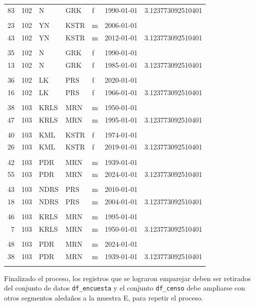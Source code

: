 \documentclass[
  12pt,
]{book}
\begin{document}
\begin{table}[t]
\begin{tabular*}{1\linewidth}{@{\extracolsep{\fill}}rrlllrr}
83 & 102 & N & GRK & f & 1990-01-01 & 3.123773092510401 \\ 
 &  &  &  &  &  &  \\ 
23 & 102 & YN & KSTR & m & 2006-01-01 &  \\ 
43 & 102 & YN & KSTR & m & 2012-01-01 & 3.123773092510401 \\ 
 &  &  &  &  &  &  \\ 
35 & 102 & N & GRK & f & 1990-01-01 &  \\ 
13 & 102 & N & GRK & f & 1985-01-01 & 3.123773092510401 \\ 
 &  &  &  &  &  &  \\ 
36 & 102 & LK & PRS & f & 2020-01-01 &  \\ 
16 & 102 & LK & PRS & f & 1966-01-01 & 3.123773092510401 \\ 
 &  &  &  &  &  &  \\ 
38 & 103 & KRLS & MRN & m & 1950-01-01 &  \\ 
47 & 103 & KRLS & MRN & m & 1995-01-01 & 3.123773092510401 \\ 
 &  &  &  &  &  &  \\ 
40 & 103 & KML & KSTR & f & 1974-01-01 &  \\ 
26 & 103 & KML & KSTR & f & 2019-01-01 & 3.123773092510401 \\ 
 &  &  &  &  &  &  \\ 
42 & 103 & PDR & MRN & m & 1939-01-01 &  \\ 
55 & 103 & PDR & MRN & m & 2024-01-01 & 3.123773092510401 \\ 
 &  &  &  &  &  &  \\ 
43 & 103 & NDRS & PRS & m & 2010-01-01 &  \\ 
18 & 103 & NDRS & PRS & m & 2004-01-01 & 3.123773092510401 \\ 
 &  &  &  &  &  &  \\ 
46 & 103 & KRLS & MRN & m & 1995-01-01 &  \\ 
 7 & 103 & KRLS & MRN & m & 1950-01-01 & 3.123773092510401 \\ 
 &  &  &  &  &  &  \\ 
48 & 103 & PDR & MRN & m & 2024-01-01 &  \\ 
38 & 103 & PDR & MRN & m & 1939-01-01 & 3.123773092510401 \\ 
 &  &  &  &  &  &  \\ 
\bottomrule
\end{tabular*}
\end{table}

Finalizado el proceso, los registros que se lograron emparejar deben ser retirados del conjunto de datos \texttt{df\_encuesta} y el conjunto \texttt{df\_censo} debe ampliarse con otros segmentos aledaños a la muestra E, para repetir el proceso.
\end{document}
